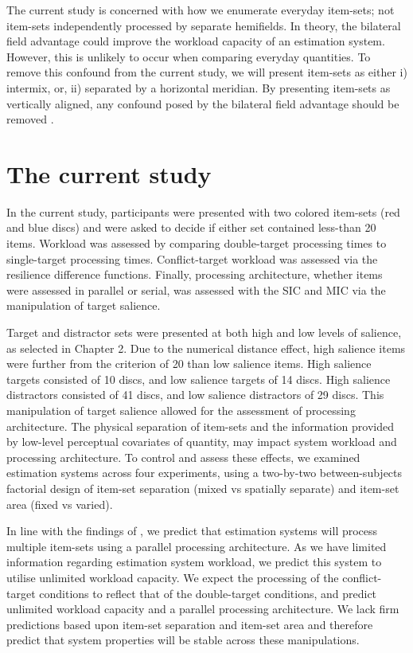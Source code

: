The current study is concerned with how we enumerate everyday item-sets; not item-sets independently processed by separate hemifields. In theory, the bilateral field advantage could improve the workload capacity of an estimation system. However, this is unlikely to occur when comparing everyday quantities. To remove this confound from the current study, we will present item-sets as either i) intermix, or, ii) separated by a horizontal meridian. By presenting item-sets as vertically aligned, any confound posed by the bilateral field advantage should be removed \cite{delvenne2011bilateral}. 

\section{The current study}
In the current study, participants were presented with two colored item-sets (red and blue discs) and were asked to decide if either set contained less-than 20 items. Workload was assessed by comparing double-target processing times to single-target processing times. Conflict-target workload was assessed via the resilience difference functions. Finally, processing architecture, whether items were assessed in parallel or serial, was assessed with the SIC and MIC via the manipulation of target salience. 

Target and distractor sets were presented at both high and low levels of salience, as selected in Chapter 2. Due to the numerical distance effect, high salience items were further from the criterion of 20 than low salience items. High salience targets consisted of 10 discs, and low salience targets of 14 discs. High salience distractors consisted of 41 discs, and low salience distractors of 29 discs. This manipulation of target salience allowed for the assessment of processing architecture. 
The physical separation of item-sets and the information provided by low-level perceptual covariates of quantity, may impact system workload and processing architecture. To control and assess these effects, we examined estimation systems across four experiments, using a two-by-two between-subjects factorial design of item-set separation (mixed vs spatially separate) and item-set area (fixed vs varied). 

In line with the findings of , we predict that estimation systems will process multiple item-sets using a parallel processing architecture. As we have limited information regarding estimation system workload, we predict this system to utilise unlimited workload capacity. We expect the processing of the conflict-target conditions to reflect that of the double-target conditions, and predict unlimited workload capacity and a parallel processing architecture. We lack firm predictions based upon item-set separation and item-set area and therefore predict that system properties will be stable across these manipulations.

